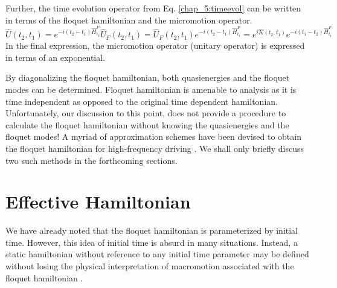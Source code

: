 Further, the time evolution operator from Eq. \eqref{chap_5:timeevol} can be written in terms of the floquet hamiltonian and the micromotion operator.
\begin{equation}
 \hat{U}(t_2, t_1) = e^{-i(t_2 - t_1)\hat{H}_{t_2}^{F}}\hat{U}_{F}(t_2, t_1) = \hat{U}_{F}(t_2, t_1)e^{-i(t_2 - t_1)\hat{H}_{t_1}^{F}} = e^{i\hat{K}(t_2, t_1)}e^{-i(t_1 - t_2)\hat{H}_{t_1}^{F}}
\end{equation} In the final expression, the micromotion operator (unitary operator) is expressed in terms of an exponential.

By diagonalizing the floquet hamiltonian, both quasienergies and the floquet modes can be determined. Floquet hamiltonian is amenable to analysis as it is time independent
as opposed to the original time dependent hamiltonian. Unfortunately, our discussion to this point, does not provide a procedure to calculate the floquet hamiltonian without
knowing the quasienergies and the floquet modes! A myriad of approximation schemes have been devised to obtain the floquet hamiltonian for high-frequency driving 
\parencite{casas2001floquet,goldman2014periodically,anisimovas2015high,mikami2016brillouin,grozdanov1988quantum}. We shall only briefly discuss two such methods in the forthcoming sections.

\section{Effective Hamiltonian}
We have already noted that the floquet hamiltonian is parameterized by initial time. However, this idea of initial time is absurd in many situations.
Instead, a static hamiltonian without reference to any initial time parameter may be defined without losing the physical interpretation of macromotion associated with the 
floquet hamiltonian \parencite{rahav2003effective, goldman2014periodically, anisimovas2015high}.

